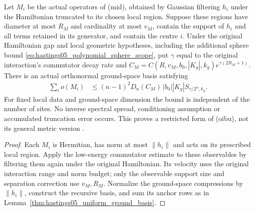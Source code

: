 \begin{lemma}
    \label{thm:hastings05_uniform_truncated_basis}
    \leanok
    Let $M_i$ be the actual operators of (mid), obtained by Gaussian
    filtering $h_i$ under the Hamiltonian truncated to its chosen local
    region. Suppose these regions have diameter at most $R_M$ and
    cardinality at most $v_M$, contain the support of $h_i$ and all terms
    retained in its generator, and contain the centre $i$.
    Under the original Hamiltonian gap and local geometric hypotheses,
    including the additional sphere bound
    \eqref{eq:hastings05_polynomial_sphere_scope},
    put $\gamma$ equal to the original interaction's commutator decay rate
    and $C_M=C(R,v_M,b_0,|K_g|,k_g)e^{\gamma(2R_M+1)}$.
    There is an actual orthonormal ground-space basis satisfying
    \begin{align}
        \sum_i o(M_i)
         & \le(n-1)^2D_n(C_M)\,|b_0||K_g|S_{\gamma/2^n,k_g}.
        \label{eq:hastings05_uniform_truncated_basis}
    \end{align}
    For fixed local data and ground-space dimension the bound is
    independent of the number of sites. No inverse spectral spread,
    conditioning assumption or accumulated truncation error occurs. This
    proves a restricted form of (oibu), not its general metric version
    \cite{gap:hastings05_geometric_growth_scope}.
\end{lemma}
\begin{proof}\leanok
    Each $M_i$ is Hermitian, has norm at most $\|h_i\|$ and acts on its
    prescribed local region. Apply the low-energy commutator estimate to
    these observables by filtering them again under the original
    Hamiltonian. Its velocity uses the original interaction range and
    norm budget; only the observable support size and separation correction
    use $v_M,R_M$. Normalize the ground-space compressions by $\|h_i\|$,
    construct the recursive basis, and sum its anchor rows as in
    Lemma~\ref{thm:hastings05_uniform_ground_basis}.
\end{proof}


